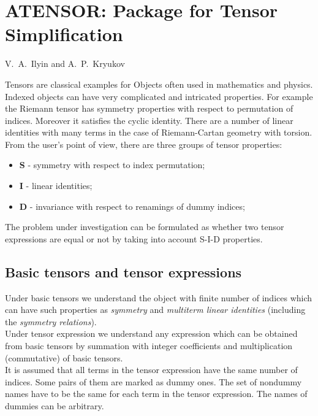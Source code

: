 \chapter[ATENSOR: Tensor Simplification]%
{ATENSOR: Package for Tensor Simplification}
\label{ATENSOR}

{\footnotesize
\begin{center}
V.~A.~Ilyin and A.~P.~Kryukov \\
\end{center}
}


Tensors are classical examples for Objects often used in mathematics and physics.
Indexed objects can have very complicated and intricated properties.
For example the Riemann tensor has symmetry properties with respect to
permutation of indices. Moreover it satisfies the cyclic identity. There are a
number of linear identities with many terms in the case of Riemann-Cartan geometry
with torsion.
From the user's point of view, there are three groups of tensor properties:
\begin{itemize}
\item {\bf S} - symmetry with respect to index permutation;
\item {\bf I} - linear identities;
\item {\bf D} - invariance with respect to renamings of dummy indices;
\end{itemize}
The problem under investigation can be formulated as whether two tensor
expressions are equal or not by taking into account S-I-D properties.

\section{Basic tensors and tensor expressions}
Under basic tensors we understand the object with finite number of indices
which can have such properties as {\it symmetry} and {\it multiterm linear identities}
(including the {\it symmetry relations}). \\
Under tensor expression we understand any expression which can be obtained
from basic tensors by summation with integer coefficients and multiplication
(commutative) of basic tensors. \\
It is assumed that all terms in the tensor expression have the same number of
indices. Some pairs of them are marked as dummy ones. The set of nondummy
names have to be the same for each term in the tensor expression. The names
of dummies can be arbitrary.

